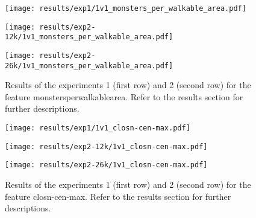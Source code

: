 \begin{figure}[h!]
	\centering
	\begin{minipage}{0.4\linewidth}
		\texttt{[image: results/exp1/1v1\_monsters\_per\_walkable\_area.pdf]}
	\end{minipage}
	
	\begin{minipage}{0.4\linewidth}
		\texttt{[image: results/exp2-12k/1v1\_monsters\_per\_walkable\_area.pdf]}
	\end{minipage}
	\begin{minipage}{0.4\linewidth}
		\texttt{[image: results/exp2-26k/1v1\_monsters\_per\_walkable\_area.pdf]}
	\end{minipage}
	
	\caption[ Results: Feature monsters\textunderscore per\textunderscore walkable\textunderscore area]{ Results of the experiments 1 (first row) and 2 (second row) for the feature monsters\textunderscore per\textunderscore walkable\textunderscore area. Refer to the results section for further descriptions. }
	\label{fig:appendix_monsters_per_walkable_area}
\end{figure}

\begin{figure}[h!]
	\centering
	\begin{minipage}{0.4\linewidth}
		\texttt{[image: results/exp1/1v1\_closn-cen-max.pdf]}
	\end{minipage}
	
	\begin{minipage}{0.4\linewidth}
		\texttt{[image: results/exp2-12k/1v1\_closn-cen-max.pdf]}
	\end{minipage}
	\begin{minipage}{0.4\linewidth}
		\texttt{[image: results/exp2-26k/1v1\_closn-cen-max.pdf]}
	\end{minipage}
	
	\caption[ Results: Feature closn-cen-max]{ Results of the experiments 1 (first row) and 2 (second row) for the feature closn-cen-max. Refer to the results section for further descriptions. }
	\label{fig:appendix_closn-cen-max}
\end{figure}
\newpage 


